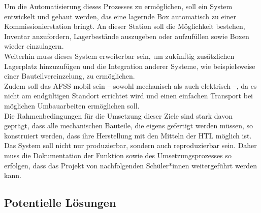 Um die Automatisierung dieses Prozesses zu ermöglichen, soll ein System entwickelt und gebaut werden, das eine lagernde Box automatisch zu einer Kommissionierstation bringt. An dieser Station soll die Möglichkeit bestehen, Inventar anzufordern, Lagerbestände auszugeben oder aufzufüllen sowie Boxen wieder einzulagern.
\\
Weiterhin muss dieses System erweiterbar sein, um zukünftig zusätzlichen Lagerplatz hinzuzufügen und die Integration anderer Systeme, wie beispielsweise einer Bauteilvereinzelung, zu ermöglichen.
\\
Zudem soll das AFSS mobil sein – sowohl mechanisch als auch elektrisch –, da es nicht am endgültigen Standort errichtet wird und einen einfachen Transport bei möglichen Umbauarbeiten ermöglichen soll.
\\
Die Rahmenbedingungen für die Umsetzung dieser Ziele sind stark davon geprägt, dass alle mechanischen Bauteile, die eigens gefertigt werden müssen, so konstruiert werden, dass ihre Herstellung mit den Mitteln der HTL möglich ist.
\\
Das System soll nicht nur produzierbar, sondern auch reproduzierbar sein. Daher muss die Dokumentation der Funktion sowie des Umsetzungsprozesses so erfolgen, dass das Projekt von nachfolgenden Schüler*innen weitergeführt werden kann.



\subsection{Potentielle Lösungen}
